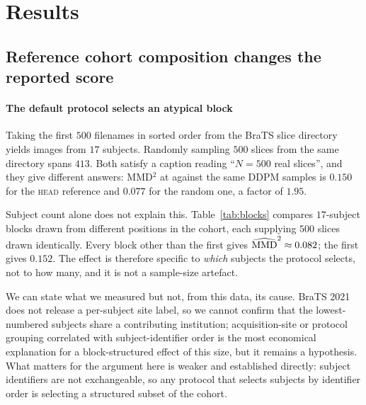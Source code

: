 \section{Results}
\label{sec:results}

\subsection{Reference cohort composition changes the reported score}
\label{sec:res_cohort}

\paragraph{The default protocol selects an atypical block}
Taking the first $500$ filenames in sorted order from the BraTS slice directory
yields images from $17$ subjects. Randomly sampling $500$ slices from the same
directory spans $413$. Both satisfy a caption reading ``$N = 500$ real
slices'', and they give different answers: MMD$^2$ at  against the same
DDPM samples is $0.150$ for the \textsc{head} reference and $0.077$ for the
random one, a factor of $1.95$.

Subject count alone does not explain this. Table~\ref{tab:blocks} compares
$17$-subject blocks drawn from different positions in the cohort, each
supplying $500$ slices drawn identically. Every block other than the first
gives $\widehat{\mathrm{MMD}}^2 \approx 0.082$; the first gives $0.152$. The effect is
therefore specific to \emph{which} subjects the protocol selects, not to how
many, and it is not a sample-size artefact.

We can state what we measured but not, from this data, its cause. BraTS 2021
does not release a per-subject site label, so we cannot confirm that the
lowest-numbered subjects share a contributing institution; acquisition-site or
protocol grouping correlated with subject-identifier order is the most
economical explanation for a block-structured effect of this size, but it
remains a hypothesis. What matters for the argument here is weaker and
established directly: subject identifiers are not exchangeable, so any protocol
that selects subjects by identifier order is selecting a structured subset of
the cohort.

